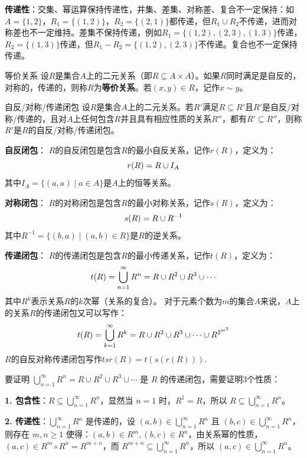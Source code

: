 \documentclass[lang=cn,11pt]{elegantbook}
\begin{document}
\textbf{传递性}：交集、幂运算保持传递性，并集、差集、对称差、复合不一定保持：如$A = \{1,2\}$，$R_1 = \{(1,2)\}$，$R_2 = \{(2,1)\}$都传递，但$R_1 \cup R_2$不传递，进而对称差也不一定维持。差集不保持传递，例如$R_1=\{(1,2),(2,3),(1,3)\}$传递，$R_2=\{(1,3)\}$传递，但$R_1-R_2=\{(1,2),(2,3)\}$不传递。复合也不一定保持传递。
\begin{definition}{等价关系}
设$R$是集合$A$上的二元关系（即$R \subseteq A \times A$）。如果$R$同时满足是自反的，对称的，传递的，则称$R$为\textbf{等价关系}。若$(x,y)\in R$，记作$x\sim y$。
\end{definition}
\begin{definition}{自反/对称/传递闭包}
    设$R$是集合$A$上的二元关系。若$R'$满足$R \subseteq R'$且$R'$是自反/对称/传递的，且对$A$上任何包含$R$并且具有相应性质的关系$R''$，都有$R'\subseteq R''$，则称$R'$是$R$的自反/对称/传递闭包。

\textbf{自反闭包}：
$R$的自反闭包是包含$R$的最小自反关系，记作$r(R)$，定义为：\vspace{-10pt}
$$r(R) = R \cup I_A\vspace{-10pt}$$
其中$I_A = \{(a,a) \mid a \in A\}$是$A$上的恒等关系。

\textbf{对称闭包}：
$R$的对称闭包是包含$R$的最小对称关系，记作$s(R)$，定义为：\vspace{-10pt}
$$s(R) = R \cup R^{-1}\vspace{-10pt}$$
其中$R^{-1} = \{(b,a) \mid (a,b) \in R\}$是$R$的逆关系。

\textbf{传递闭包}：
$R$的传递闭包是包含$R$的最小传递关系，记作$t(R)$，定义为：\vspace{-10pt}
$$t(R) = \bigcup_{n=1}^{\infty} R^n = R \cup R^2 \cup R^3 \cup \cdots\vspace{-10pt}$$
其中$R^k$表示关系$R$的$k$次幂（关系的复合）。 对于元素个数为$m$的集合$A$来说，$A$上的关系$R$的传递闭包又可以写作：
\vspace{-10pt}
$$t(R) = \bigcup_{k=1}^{\infty} R^k = R \cup R^2 \cup R^3 \cup \cdots\cup R^{2^{m^2}}\vspace{-10pt}$$
$R$的自反对称传递闭包写作$tsr(R)=t(s(r(R)))$.
\end{definition}
要证明 $\bigcup_{n=1}^{\infty} R^n = R \cup R^2 \cup R^3 \cup \cdots$ 是 $R$ 的传递闭包，需要证明3个性质：

\textbf{1. 包含性}：$R \subseteq \bigcup_{n=1}^{\infty} R^n$，显然当 $n=1$ 时，$R^1 = R$，所以 $R \subseteq \bigcup_{n=1}^{\infty} R^n$。

\textbf{2. 传递性}：$\bigcup_{n=1}^{\infty} R^n$ 是传递的，设 $(a,b) \in \bigcup_{n=1}^{\infty} R^n$ 且 $(b,c) \in \bigcup_{n=1}^{\infty} R^n$，则存在 $m,n \geq 1$ 使得：$(a,b) \in R^m ,(b,c) \in R^n$，由关系幂的性质，$(a,c) \in R^m \circ R^n = R^{m+n}$，而 $R^{m+n} \subseteq \bigcup_{n=1}^{\infty} R^n$，所以 $(a,c) \in \bigcup_{n=1}^{\infty} R^n$。
\end{document}
